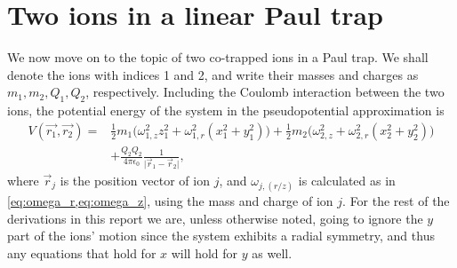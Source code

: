 \section{Two ions in a linear Paul trap}
\label{sec:2Ion}
We now move on to the topic of two co-trapped ions in a Paul trap. We shall denote the ions with indices 1 and 2, and write their masses and charges as $m_1,m_2,Q_1,Q_2$, respectively.
Including the Coulomb interaction between the two ions, the potential energy of the system in the pseudopotential approximation is
\begin{align}
    \nonumber V(\vec{r_1},\vec{r_2}) = &\frac{1}{2}m_1\bigg(\omega_{1,z}^2z_1^2+\omega_{1,r}^2(x_1^2+y_1^2)\bigg)+\frac{1}{2}m_2\bigg(\omega_{2,z}^2+\omega_{2,r}^2(x_2^2+y_2^2)\bigg)\\
    & +\frac{Q_2Q_2}{4\pi\epsilon_0}\frac{1}{\vert \vec{r}_1-\vec{r}_2\vert},
    \label{eq:fullV}
\end{align}
where $\vec{r}_j$ is the position vector of ion $j$, and $\omega_{j,(r/z)}$ is calculated as in \cref{eq:omega_r,eq:omega_z}, using the mass and charge of ion $j$.
For the rest of the derivations in this report we are, unless otherwise noted, going to ignore the $y$ part of the ions' motion since the system exhibits a radial symmetry, and thus any equations that hold for $x$ will hold for $y$ as well.

